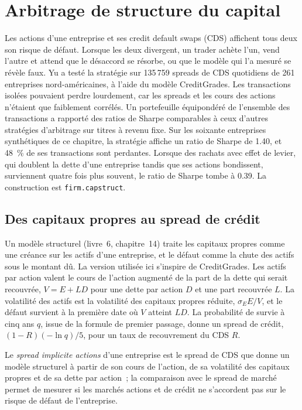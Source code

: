 \chapter{Arbitrage de structure du capital}\label{ch:s2:capital-structure-arbitrage}

Les actions d'une entreprise et ses credit default swaps (CDS) affichent tous deux son risque de défaut. Lorsque les deux divergent, un trader achète l'un, vend l'autre et attend que le
désaccord se résorbe, ou que le modèle qui l'a mesuré se révèle faux. Yu a testé la stratégie sur 135\,759 spreads de CDS quotidiens de 261
entreprises nord-américaines, à l'aide du modèle CreditGrades. Les transactions isolées pouvaient perdre lourdement, car les spreads et les cours des actions n'étaient que faiblement corrélés. Un portefeuille
équipondéré de l'ensemble des transactions a rapporté des ratios de Sharpe comparables à ceux d'autres stratégies d'arbitrage sur titres à revenu fixe. Sur les soixante entreprises synthétiques de ce chapitre,
la stratégie affiche un ratio de Sharpe de 1.40, et 48~\% de ses transactions sont perdantes. Lorsque des rachats avec effet de levier, qui doublent la dette d'une entreprise tandis que ses actions bondissent, surviennent
quatre fois plus souvent, le ratio de Sharpe tombe à 0.39. La construction est \texttt{firm.capstruct}.

\section{Des capitaux propres au spread de crédit}

Un modèle structurel (livre~6, chapitre~14) traite les capitaux propres comme une créance sur les actifs d'une entreprise, et le défaut comme la chute des actifs sous le montant dû. La version
utilisée ici s'inspire de CreditGrades. Les actifs par action valent le cours de l'action augmenté de la part de la dette qui serait recouvrée, $V = E + LD$ pour
une dette par action $D$ et une part recouvrée $L$. La volatilité des actifs est la volatilité des capitaux propres réduite, $\sigma_E E/V$, et le défaut survient à la première date où $V$ atteint $LD$.
La probabilité de survie à cinq ans $q$, issue de la formule de premier passage, donne un spread de crédit, $(1 - R)(-\ln q)/5$, pour un taux de recouvrement du CDS $R$.

\begin{definition}\label{def:s2:capital-structure-arbitrage:implied}
Le \emph{spread implicite actions} d'une entreprise est le spread de CDS que donne un modèle structurel à partir de son
cours de l'action, de sa volatilité des capitaux propres et de sa dette par action~; la comparaison avec le spread de marché permet de mesurer si les marchés actions et de crédit ne s'accordent pas sur
le risque de défaut de l'entreprise.
\end{definition}

